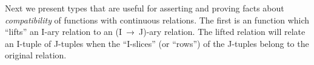 Next we present types that are useful for asserting and proving facts about \emph{compatibility} of functions with continuous relations. The first is an  function which ``lifts'' an \ab I-ary relation to an (\ab I~\as →~\ab J)-ary relation. The lifted relation will relate an \ab I-tuple of \ab J-tuples when the ``\ab I-slices'' (or ``rows'') of the \ab J-tuples belong to the original relation.
\ccpad
\begin{code}%
\>[0][@{}l@{\AgdaIndent{0}}]%
\>[1]\AgdaSpace{}%
\AgdaSymbol{:}\AgdaSpace{}%
\AgdaSpace{}%
\AgdaSpace{}%
\AgdaSpace{}%
\AgdaSpace{}%
\AgdaSpace{}%
\AgdaSymbol{(}\AgdaSpace{}%
\AgdaSpace{}%
\AgdaSpace{}%
\AgdaSpace{}%
\AgdaSymbol{)}\AgdaSpace{}%
\AgdaSpace{}%
\AgdaSpace{}%
\AgdaSpace{}%
\AgdaSpace{}%
\<%
\\
%
\>[1]\AgdaSpace{}%
\AgdaSpace{}%
\AgdaSpace{}%
\AgdaSymbol{=}\AgdaSpace{}%
\AgdaSpace{}%
\AgdaSpace{}%
\AgdaSpace{}%
\AgdaSpace{}%
\AgdaFunction{,}\AgdaSpace{}%
\AgdaSpace{}%
\AgdaSpace{}%
\AgdaSpace{}%
\AgdaSpace{}%
\AgdaSpace{}%
\AgdaSpace{}%
\<%
\\
%
\\[\AgdaEmptyExtraSkip]%
%
\>[1]\AgdaSpace{}%

\end{code}
